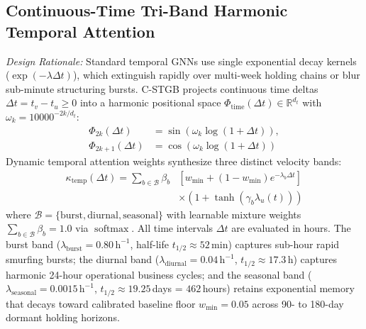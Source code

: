 \subsection{Continuous-Time Tri-Band Harmonic Temporal Attention}
\label{sec:temporal_attention}
\textit{Design Rationale:} Standard temporal GNNs use single exponential decay kernels ($\exp(-\lambda \Delta t)$), which extinguish rapidly over multi-week holding chains or blur sub-minute structuring bursts. C-STGB projects continuous time deltas $\Delta t = t_v - t_u \ge 0$ into a harmonic positional space $\Phi_{\text{time}}(\Delta t) \in \mathbb{R}^{d_t}$ with $\omega_k = 10000^{-2k/d_t}$:
\begin{align}
\Phi_{2k}(\Delta t) &= \sin\left(\omega_k \log(1 + \Delta t)\right), \\
\Phi_{2k+1}(\Delta t) &= \cos\left(\omega_k \log(1 + \Delta t)\right)
\end{align}
Dynamic temporal attention weights synthesize three distinct velocity bands:
\begin{equation}
\begin{split}
\kappa_{\text{temp}}(\Delta t) = \sum_{b \in \mathcal{B}} \beta_b &\left[ w_{\min} + (1 - w_{\min}) e^{-\lambda_b \Delta t} \right] \\
&\times \left( 1 + \tanh(\gamma_b \lambda_u(t)) \right)
\end{split}
\end{equation}
where $\mathcal{B} = \{\text{burst}, \text{diurnal}, \text{seasonal}\}$ with learnable mixture weights $\sum_{b \in \mathcal{B}} \beta_b = 1.0$ via $\operatorname{softmax}$. All time intervals $\Delta t$ are evaluated in hours. The burst band ($\lambda_{\text{burst}} = 0.80\,\text{h}^{-1}$, half-life $t_{1/2} \approx 52$\,min) captures sub-hour rapid smurfing bursts; the diurnal band ($\lambda_{\text{diurnal}} = 0.04\,\text{h}^{-1}$, $t_{1/2} \approx 17.3$\,h) captures harmonic 24-hour operational business cycles; and the seasonal band ($\lambda_{\text{seasonal}} = 0.0015\,\text{h}^{-1}$, $t_{1/2} \approx 19.25$\,days = $462$\,hours) retains exponential memory that decays toward calibrated baseline floor $w_{\min}=0.05$ across 90- to 180-day dormant holding horizons.

